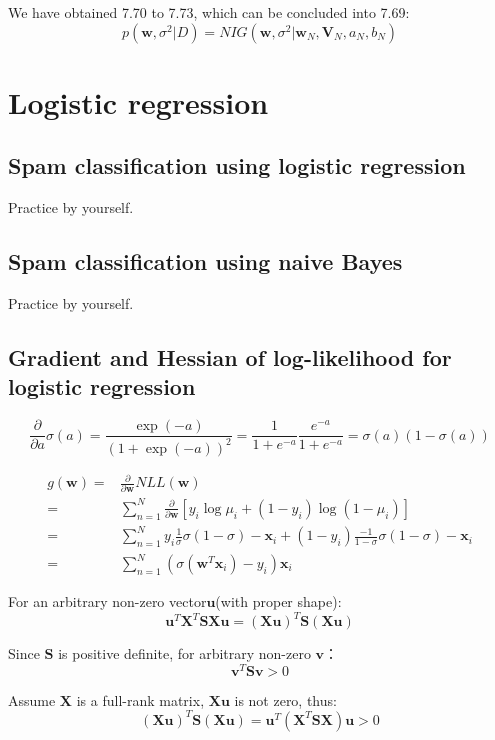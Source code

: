 \documentclass[UTF8]{ctexart}
\begin{document}
We have obtained 7.70 to 7.73, which can be concluded into 7.69:
$$p(\textbf{w},\sigma^{2}|D)=NIG(\textbf{w},\sigma^{2}|\textbf{w}_{N},\textbf{V}_{N},a_{N},b_{N})$$

\newpage
\section{Logistic regression}
\subsection{Spam classification using logistic regression}
Practice by yourself.

\subsection{Spam classification using naive Bayes}
Practice by yourself.

\subsection{Gradient and Hessian of log-likelihood for logistic regression}
$$\frac{\partial}{\partial a} \sigma(a) = \frac{\exp(-a)}{(1+\exp(-a))^{2}} = \frac{1}{1+e^{-a}}\frac{e^{-a}}{1+e^{-a}}=\sigma(a)(1-\sigma(a))$$

\begin{align}
g(\textbf{w})=&\frac{\partial}{\partial \textbf{w}}NLL(\textbf{w})\nonumber \\
=&\sum_{n=1}^{N}\frac{\partial}{\partial \textbf{w}} [y_{i}\log \mu_{i} + (1-y_{i})\log (1-\mu_{i})]\nonumber \\
=&\sum_{n=1}^{N}y_{i}\frac{1}{\sigma}\sigma(1-\sigma)-\textbf{x}_{i}+(1-y_{i})\frac{-1}{1-\sigma}\sigma(1-\sigma)-\textbf{x}_{i}\nonumber \\
=&\sum_{n=1}^{N}(\sigma(\textbf{w}^{T}\textbf{x}_{i})-y_{i})\textbf{x}_{i}\nonumber
\end{align}

For an arbitrary non-zero vector$\textbf{u}$(with proper shape):
$$\textbf{u}^{T}\textbf{X}^{T}\textbf{S}\textbf{X}\textbf{u}=(\textbf{X}\textbf{u})^{T}\textbf{S}(\textbf{X}\textbf{u})$$

Since $\textbf{S}$ is positive definite, for arbitrary non-zero $\textbf{v}$：
$$\textbf{v}^{T}\textbf{S}\textbf{v} > 0$$

Assume $\textbf{X}$ is a full-rank matrix, $\textbf{X}\textbf{u}$ is not zero, thus:
$$(\textbf{X}\textbf{u})^{T}\textbf{S}(\textbf{X}\textbf{u}) = \textbf{u}^{T}(\textbf{X}^{T}\textbf{S}\textbf{X})\textbf{u} > 0$$
\end{document}
